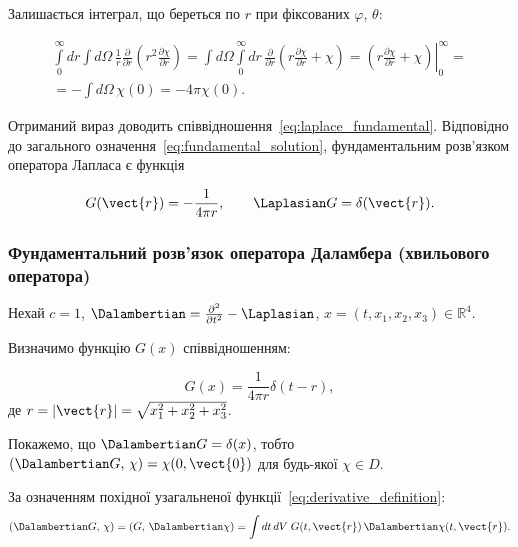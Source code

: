 Залишається інтеграл, що береться по \( r \) при фіксованих \( \varphi \), \( \theta \):

\begin{multline*}
\int\limits_0^\infty dr \int d\Omega \, \frac{1}{r} \frac{\partial}{\partial r} \left( r^2 \frac{\partial \chi}{\partial r} \right) =
\int d\Omega
\int\limits_0^\infty dr \, \frac{\partial}{\partial r} \left( r \frac{\partial \chi}{\partial r} + \chi \right) = \left.\left( r \frac{\partial
\chi}{\partial r} +
\chi
\right)\right|_0^\infty = \\ =- \int d\Omega \, \chi(0) = -4\pi \chi(0).
\end{multline*}

Отриманий вираз доводить співвідношення~\eqref{eq:laplace_fundamental}. Відповідно до загального означення~\eqref{eq:fundamental_solution}, фундаментальним розв'язком оператора Лапласа є функція

\begin{equation}\label{eq:laplace_G}
    G(\vect{r}) = -\frac{1}{4\pi r}, \qquad \Laplasian G = \delta(\vect{r}).
\end{equation}

\subsubsection{Фундаментальний розв'язок оператора Даламбера (хвильового оператора)}

Нехай \( c = 1 \), \( \Dalambertian = \frac{\partial^2}{\partial t^2} - \Laplasian \),
\( x = (t, x_1, x_2, x_3) \in \mathbb{R}^4 \).

Визначимо функцію \( G(x) \) співвідношенням:

\begin{equation}
    G(x) = \frac{1}{4\pi r} \delta(t - r),
    \label{eq:dalambert_fundamental}
\end{equation}
%
де \( r = |\vect{r}| = \sqrt{x_1^2 + x_2^2 + x_3^2} \).

Покажемо, що \( \Dalambertian G = \delta(x) \), тобто
\( (\Dalambertian G,\, \chi) = \chi(0,\vect{0}) \) для будь-якої \( \chi \in D \).

За означенням похідної узагальненої функції~\eqref{eq:derivative_definition}:
\begin{equation*}
    (\Dalambertian G,\, \chi) = (G,\, \Dalambertian \chi)
    = \int dt\, dV\; G(t,\vect{r})\, \Dalambertian \chi(t,\vect{r}).
\end{equation*}

